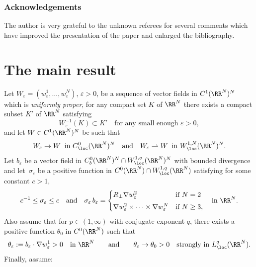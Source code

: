 \subsubsection*{Acknowledgements} The author is very grateful to the unknown referees for several comments which have improved the presentation of the paper and enlarged the bibliography.

\section{The main result}\label{s.res}
Let $W_\varepsilon=(w_\varepsilon^1,\dots,w_\varepsilon^N)$, $\varepsilon>0$, be a sequence of vector fields in $C^1(\RR^N)^N$
which is {\em uniformly proper}, \ie for any compact set $K$ of $\RR^N$ there exists a compact subset $K'$ of $\RR^N$ satisfying\enlargethispage{-\baselineskip}%
\begin{equation}\label{upWe}
W_\varepsilon^{-1}(K)\subset K'\quad\mbox{for any small enough }\varepsilon>0,
\end{equation}
and let $W\in C^1(\RR^N)^N$ be such that
\begin{equation}\label{cWe}
W_\varepsilon\to W\;\;\mbox{in }C^0_\loc(\RR^N)^N\quad\mbox{and}\quad W_\varepsilon\rightharpoonup W\;\;\mbox{in }W^{1,N}_\loc(\RR^N)^N.
\end{equation}
Let $b_\varepsilon$ be a vector field in $C^0_b(\RR^N)^N\cap W^{1,q}_\loc(\RR^N)^N$ with bounded divergence and let~$\sigma_\varepsilon$ be a positive function in $C^0(\RR^N)\cap W^{1,q}_\loc(\RR^N)$ satisfying for some constant $c>1$,
\begin{equation}\label{siebe}
c^{-1}\leq\sigma_\varepsilon\leq c\quad\mbox{and}\quad
\sigma_\varepsilon\,b_\varepsilon=\begin{cases}
R_\perp\nabla w_\varepsilon^2 & \mbox{if }N=2
\\[3pt]
\nabla w_\varepsilon^2\times\cdots\times \nabla w_\varepsilon^N & \mbox{if }N\geq 3,
\end{cases}
\quad \mbox{in }\RR^N.
\end{equation}
Also assume that for $p\in(1,\infty)$ with conjugate exponent $q$, there exists a positive function $\theta_0$ in $C^0(\RR^N)$ such that
\begin{equation}\label{cthe}
\theta_\varepsilon:=b_\varepsilon\cdot\nabla w_\varepsilon^1>0\quad\mbox{in }\RR^N \qquad\mbox{and}\qquad \theta_\varepsilon\to\theta_0>0\quad\mbox{strongly in }L^q_\loc(\RR^N).
\end{equation}
\pagebreak[2]%
Finally, assume:
